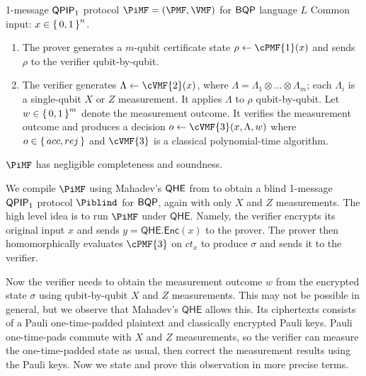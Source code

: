 \begin{protocol}{1-message $\operatorname{\mathsf{QPIP}}_1$ protocol $\PiMF = (\PMF, \VMF)$ for $\operatorname{\mathsf{BQP}}$ language $L$}
	\label{proto:BQP}
	Common input: $x\in\set{0,1}^n$. 
	\begin{enumerate}
		\item The prover generates a $m$-qubit certificate state $\rho\leftarrow\cPMF{1}(x)$ and sends $\rho$ to the verifier qubit-by-qubit.
		\item The verifier generates $\Lambda \leftarrow \cVMF{2}(x)$, where $\Lambda=\Lambda_1\otimes\ldots\otimes\Lambda_m$;
			each $\Lambda_i$ is a single-qubit $X$ or $Z$ measurement.
			It applies $\Lambda$ to $\rho$ qubit-by-qubit.
			Let $w \in \set{0,1}^m$ denote the measurement outcome.
			It verifies the measurement outcome and produces a decision $o\leftarrow\cVMF{3}(x, \Lambda, w)$ where $o\in\set{acc, rej}$ and $\cVMF{3}$ is a classical polynomial-time algorithm.
	\end{enumerate}
\end{protocol}
\begin{thm}
    $\PiMF$ has negligible completeness and soundness.
\end{thm}

We compile $\PiMF$ using Mahadev's $\mathsf{QHE}$ from \cite{mahadev_qfhe} to obtain a blind 1-message $\operatorname{\mathsf{QPIP}}_1$ protocol $\Piblind$ for $\operatorname{\mathsf{BQP}}$, again with only $X$ and $Z$ measurements.
The high level idea is to run $\PiMF$ under $\mathsf{QHE}$.
Namely, the verifier encrypts its original input $x$ and sends $y=\mathsf{QHE.Enc}(x)$ to the prover.
The prover then homomorphically evaluates $\cPMF{3}$ on $ct_x$ to produce $\sigma$ and sends it to the verifier.

Now the verifier needs to obtain the measurement outcome $w$ from the encrypted state $\sigma$ using qubit-by-qubit $X$ and $Z$ measurements.
This may not be possible in general, but we observe that Mahadev's $\mathsf{QHE}$ allows this. 
Its ciphertexts consists of a Pauli one-time-padded plaintext and classically encrypted Pauli keys.
Pauli one-time-pads commute with $X$ and $Z$ measurements, so the verifier can measure the one-time-padded state as usual, then correct the measurement results using the Pauli keys.
Now we state and prove this observation in more precise terms.

